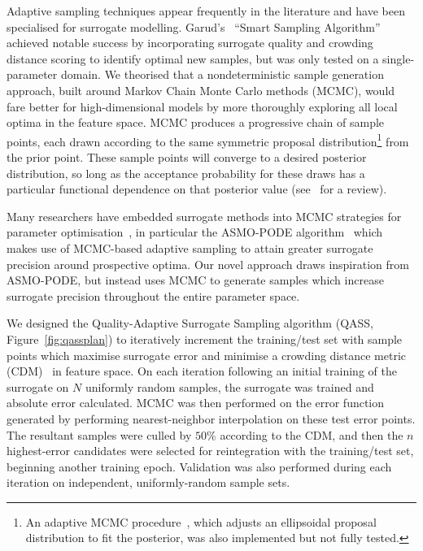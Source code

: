 Adaptive sampling techniques appear frequently in the literature and have been
specialised for surrogate modelling. Garud's~\cite{Garud2016} ``Smart Sampling
Algorithm'' achieved notable success by incorporating surrogate quality and
crowding distance scoring to identify optimal new samples, but was only tested
on a single-parameter domain. We theorised that a nondeterministic sample
generation approach, built around Markov Chain Monte Carlo methods (MCMC), would
fare better for high-dimensional models by more thoroughly exploring all local
optima in the feature space. MCMC produces a progressive chain of sample points,
each drawn according to the same symmetric proposal distribution\footnote{An
adaptive MCMC procedure~\cite{Zhang2012}, which adjusts an ellipsoidal proposal
distribution to fit the posterior, was also implemented but not fully tested.}
from the prior point. These sample points will converge to a desired posterior
distribution, so long as the acceptance probability for these draws has a
particular functional dependence on that posterior value (see~\cite{Zhou2018}
for a review).


Many researchers have embedded surrogate methods into MCMC strategies for
parameter optimisation~\cite{Zhang2020,Gong2017}, in particular the ASMO-PODE
algorithm~\cite{Ginting2011} which makes use of MCMC-based adaptive sampling to
attain greater surrogate precision around prospective optima. Our novel approach
draws inspiration from ASMO-PODE, but instead uses MCMC to generate samples
which increase surrogate precision throughout the entire parameter space.

We designed the Quality-Adaptive Surrogate Sampling algorithm (QASS,
Figure~\ref{fig:qassplan}) to iteratively increment the training/test set with sample
points which maximise surrogate error and minimise a crowding distance metric
(CDM)~\cite{Solonen2012} in feature space. On each iteration following an initial training of the surrogate on $N$ uniformly random samples, the surrogate was trained and absolute error calculated. MCMC was then performed on the error function generated by performing nearest-neighbor interpolation on these test error points. The resultant samples were culled by $50\%$ according to the CDM, and then the $n$ highest-error candidates were selected for reintegration with the training/test set, beginning another training epoch. Validation was also performed during each iteration on independent, uniformly-random sample sets.

